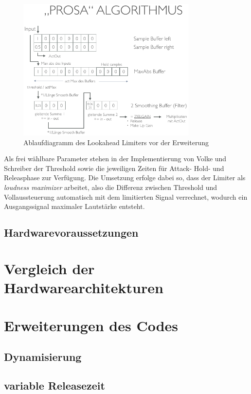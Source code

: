 \documentclass[paper=a4, fontsize=12pt]{scrartcl}
\numberwithin{equation}{section}		%
\numberwithin{figure}{section}			%
\numberwithin{table}{section}				%
\begin{document}
\begin{figure}[hbt]
  \centering
  \label{fig:old_limiter_bsb}
  \includegraphics[width=0.8\textwidth]{graphics/prosalim_ablauf}
  \caption{Ablaufdiagramm des Lookahead Limiters vor der Erweiterung \cite{VS15}}
\end{figure}


Als frei wählbare Parameter stehen in der Implementierung von Volke und Schreiber der Threshold sowie die jeweiligen Zeiten für Attack- Hold- und Releasphase zur Verfügung. Die Umsetzung erfolge dabei so, dass der Limiter als \textit{loudness maximizer} arbeitet, also die Differenz zwischen Threshold und Vollaussteuerung automatisch mit dem limitierten Signal verrechnet, wodurch ein Ausgangssignal maximaler Lautstärke entsteht. 


\subsection{Hardwarevoraussetzungen}

\section{Vergleich der Hardwarearchitekturen}

\section{Erweiterungen des Codes}

\subsection{Dynamisierung}
\subsection{variable Releasezeit}
\end{document}
